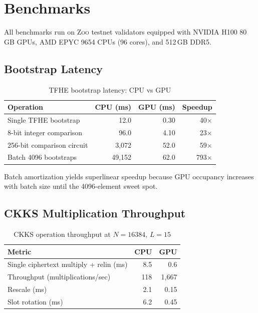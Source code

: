 \documentclass[11pt,letterpaper]{article}
\theoremstyle{definition}
\theoremstyle{remark}
\newcommand{\Zoo}{\textsc{Zoo}}
\begin{document}
\section{Benchmarks}
\label{sec:bench}

All benchmarks run on \Zoo{} testnet validators equipped with NVIDIA H100 80\,GB GPUs, AMD EPYC 9654 CPUs (96 cores), and 512\,GB DDR5.

\subsection{Bootstrap Latency}

\begin{table}[h]
\centering
\begin{tabular}{lrrr}
\toprule
\textbf{Operation} & \textbf{CPU (ms)} & \textbf{GPU (ms)} & \textbf{Speedup} \\
\midrule
Single TFHE bootstrap & 12.0 & 0.30 & 40$\times$ \\
8-bit integer comparison & 96.0 & 4.10 & 23$\times$ \\
256-bit comparison circuit & 3{,}072 & 52.0 & 59$\times$ \\
Batch 4096 bootstraps & 49{,}152 & 62.0 & 793$\times$ \\
\bottomrule
\end{tabular}
\caption{TFHE bootstrap latency: CPU vs GPU}
\label{tab:bootstrap}
\end{table}

Batch amortization yields superlinear speedup because GPU occupancy increases with batch size until the 4096-element sweet spot.

\subsection{CKKS Multiplication Throughput}

\begin{table}[h]
\centering
\begin{tabular}{lrr}
\toprule
\textbf{Metric} & \textbf{CPU} & \textbf{GPU} \\
\midrule
Single ciphertext multiply + relin (ms) & 8.5 & 0.6 \\
Throughput (multiplications/sec) & 118 & 1{,}667 \\
Rescale (ms) & 2.1 & 0.15 \\
Slot rotation (ms) & 6.2 & 0.45 \\
\bottomrule
\end{tabular}
\caption{CKKS operation throughput at $N = 16384$, $L = 15$}
\label{tab:ckks}
\end{table}
\end{document}
